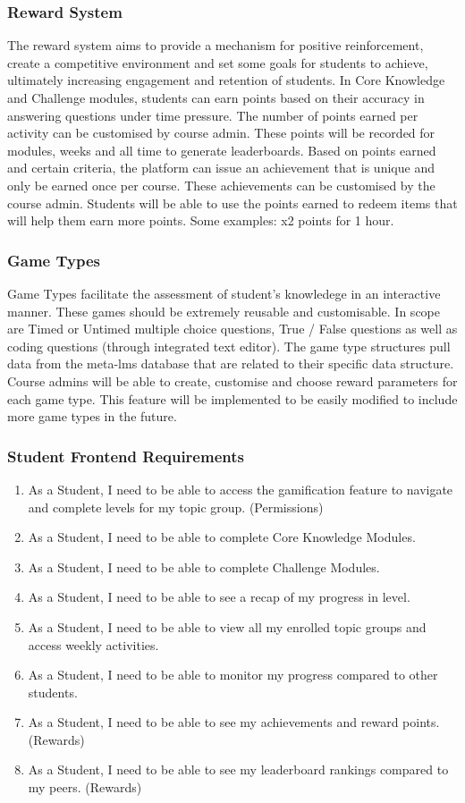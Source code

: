 \subsubsection{Reward System}
The reward system aims to provide a mechanism for positive reinforcement, create a competitive environment and set some goals for students to achieve, ultimately increasing engagement and retention of students.
In Core Knowledge and Challenge modules, students can earn points based on their accuracy in answering questions under time pressure. The number of points earned per activity can be customised by course admin. These points will be recorded for modules, weeks and all time to generate leaderboards. Based on points earned and certain criteria, the platform can issue an achievement that is unique and only be earned once per course. These achievements can be customised by the course admin. Students will be able to use the points earned to redeem items that will help them earn more points. Some examples: x2 points for 1 hour. 

\subsubsection{Game Types}
Game Types facilitate the assessment of student's knowledege in an interactive manner. These games should be extremely reusable and customisable.
In scope are Timed or Untimed multiple choice questions, True / False questions as well as coding questions (through integrated text editor). The game type structures pull data from the meta-lms database that are related to their specific data structure. Course admins will be able to create, customise and choose reward parameters for each game type. This feature will be implemented to be easily modified to include more game types in the future.

\subsubsection{Student Frontend Requirements}
\begin{enumerate}
    \item As a Student, I need to be able to access the gamification feature to navigate and complete levels for my topic group. (Permissions)
    \item As a Student, I need to be able to complete Core Knowledge Modules. 
    \item As a Student, I need to be able to complete Challenge Modules.
    \item As a Student, I need to be able to see a recap of my progress in level.
    \item As a Student, I need to be able to view all my enrolled topic groups and access weekly activities.
    \item As a Student, I need to be able to monitor my progress compared to other students.
    \item As a Student, I need to be able to see my achievements and reward points. (Rewards)
    \item As a Student, I need to be able to see my leaderboard rankings compared to my peers. (Rewards)
\end{enumerate}

